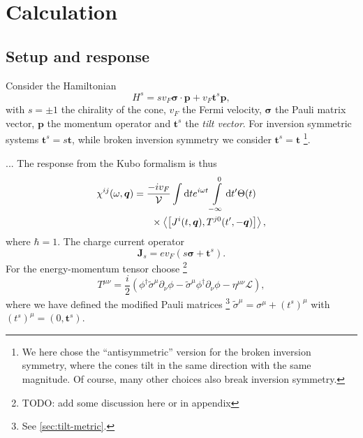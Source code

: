 \documentclass[%
 reprint,
 amsmath,amssymb,
 aps,
]{revtex4-2}
\renewcommand\vec\bm  %
\begin{document}
\maketitle

\section{Calculation\label{sec:calculation}}
\subsection{Setup and response}
Consider the Hamiltonian
\begin{equation}
  \label{eq:hamiltonian}
  H^s = s v_F \vec{\sigma} \cdot \vec{p} + v_F \vec{t}^s \vec{p},
\end{equation}
with \( s = \pm 1 \) the chirality of the cone, \( v_F \) the Fermi velocity, \( \vec{\sigma} \) the Pauli matrix vector, \( \vec{p} \) the momentum operator and \( \vec{t}^s \) the \emph{tilt vector}.
For inversion symmetric systems \( \vec{t}^s = s \vec{t} \), while broken inversion symmetry we consider \( \vec{t}^s = \vec{t} \)
\footnote{We here chose the ``antisymmetric'' version for the broken inversion symmetry, where the cones tilt in the same direction with the same magnitude.
Of course, many other choices also break inversion symmetry.}.

...
The response from the Kubo formalism is thus
\begin{equation}
  \label{eq:kubo-response}
  \begin{multlined}
    \chi^{ij}(\omega, \vec{q}) = \frac{-i v_F}{\mathcal{V}}
    \int \mathrm{d} t
    e^{i \omega t}
    \int\limits_{-\infty}^0 \mathrm{d} t'
    \Theta(t)\\
    \times
    \Braket{\left[J^i(t, \vec{q}), T^{j0}(t', -\vec{q})\right]},
  \end{multlined}
\end{equation}
where \( \hbar = 1 \).
The charge current operator
\begin{equation}
  \label{eq:current-op}
  \vec{J}_s = e v_F (s \vec{\sigma} + \vec{t}^s).
\end{equation}
For the energy-momentum tensor choose
\footnote{TODO: add some discussion here or in appendix}
\begin{equation}
  \label{eq:energy-momentum-tensor}
  T^{\mu\nu} =
  \frac{i}{2} (
  \phi^{\dagger} \tilde{\sigma}^{\mu} \partial_{\nu} \phi
  -\tilde{\sigma} ^{\mu} \phi^{\dagger} \partial_{\nu} \phi
  -\eta^{\mu \nu} \mathcal{L}
  ),
\end{equation}
where we have defined the modified Pauli matrices%
\footnote{See \cref{sec:tilt-metric}.}
\( \tilde{\sigma} ^{\mu} = \sigma^{\mu} + (t^s)^{\mu} \) with \( (t^s)^{\mu} = (0, \vec{t}^s) \).
\end{document}
